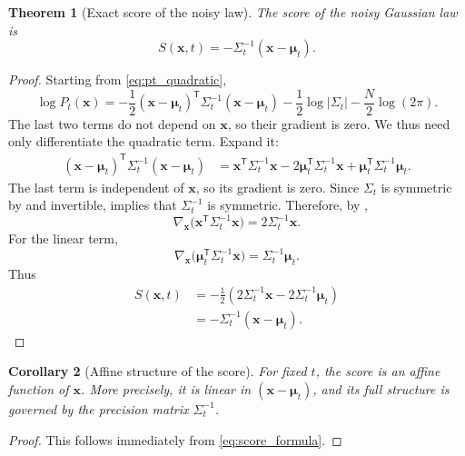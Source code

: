 \documentclass[11pt]{article}
\numberwithin{equation}{section}
\newtheorem{theorem}{Theorem}[section]
\newtheorem{corollary}[theorem]{Corollary}
\theoremstyle{definition}
\theoremstyle{remark}
\newcommand{\trans}{\mathsf{T}}
\begin{document}
\begin{theorem}[Exact score of the noisy law]\label{thm:score}
The score of the noisy Gaussian law is
\begin{equation}\label{eq:score_formula}
S(\mathbf x,t)
=
-\Sigma_t^{-1}(\mathbf x-\boldsymbol{\mu}_t).
\end{equation}
\end{theorem}

\begin{proof}
Starting from \eqref{eq:pt_quadratic},
\[
\log P_t(\mathbf x)
=
-\frac12(\mathbf x-\boldsymbol{\mu}_t)^\trans\Sigma_t^{-1}(\mathbf x-\boldsymbol{\mu}_t)
-\frac12\log|\Sigma_t|
-\frac{N}{2}\log(2\pi).
\]
The last two terms do not depend on $\mathbf x$, so their gradient is zero. We thus need only differentiate the quadratic term. Expand it:
\begin{align*}
(\mathbf x-\boldsymbol{\mu}_t)^\trans\Sigma_t^{-1}(\mathbf x-\boldsymbol{\mu}_t)
&=
\mathbf x^\trans\Sigma_t^{-1}\mathbf x
-2\boldsymbol{\mu}_t^\trans\Sigma_t^{-1}\mathbf x
+\boldsymbol{\mu}_t^\trans\Sigma_t^{-1}\boldsymbol{\mu}_t.
\end{align*}
The last term is independent of $\mathbf x$, so its gradient is zero. Since $\Sigma_t$ is symmetric by  and invertible,  implies that $\Sigma_t^{-1}$ is symmetric. Therefore, by ,
\[
\nabla_{\mathbf x}\big(\mathbf x^\trans\Sigma_t^{-1}\mathbf x\big)=2\Sigma_t^{-1}\mathbf x.
\]
For the linear term,
\[
\nabla_{\mathbf x}\big(\boldsymbol{\mu}_t^\trans\Sigma_t^{-1}\mathbf x\big)=\Sigma_t^{-1}\boldsymbol{\mu}_t.
\]
Thus
\begin{align*}
S(\mathbf x,t)
&=
-\frac12\left(2\Sigma_t^{-1}\mathbf x-2\Sigma_t^{-1}\boldsymbol{\mu}_t\right) \\
&=
-\Sigma_t^{-1}(\mathbf x-\boldsymbol{\mu}_t).
\end{align*}
\end{proof}

\begin{corollary}[Affine structure of the score]
For fixed $t$, the score is an affine function of $\mathbf x$. More precisely, it is linear in $(\mathbf x-\boldsymbol{\mu}_t)$, and its full structure is governed by the precision matrix $\Sigma_t^{-1}$.
\end{corollary}

\begin{proof}
This follows immediately from \eqref{eq:score_formula}.
\end{proof}
\end{document}
